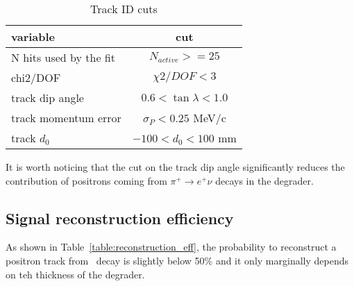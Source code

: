\begin{table}[H]
  \centering
  \begin{tabularx} {0.5\textwidth}{|X|c|}  %
    \hline
    variable                &   cut                        \\
    \hline                         
    N hits used by the fit  &   $N_{active}>= 25$            \\
    \hline                         
    chi2/DOF                &   $\chi2/DOF < 3$            \\
    \hline                         
    track dip angle         &   $0.6 < \tan \lambda < 1.0$ \\
    \hline                         
    track momentum error    &   $\sigma_P < 0.25$ MeV/c     \\
    \hline                         
    track $d_0$             &   $-100 < d_0 < 100$ mm     \\
    \hline
  \end{tabularx}
  \caption{
    \label{table:track_id_cuts}
    Track ID cuts
  }
\end{table}

It is worth noticing that the cut on the track dip angle significantly reduces
the contribution of positrons coming from $\pi^+ \to e^+ \nu$ decays in the degrader.

\subsection{Signal reconstruction efficiency}


As shown in Table~\ref{table:reconstruction_eff}, the probability to reconstruct
a positron track from \piplusenu\ decay
is slightly below 50\% and it only marginally depends on teh thickness of the degrader.

